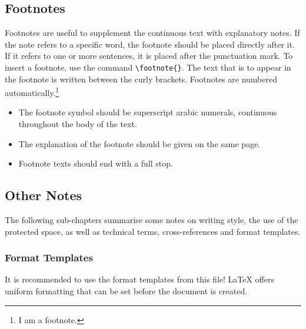 \subsection{Footnotes}

Footnotes are useful to supplement the continuous text with explanatory notes. If the note refers to a specific word, the footnote should be placed directly after it. If it refers to one or more sentences, it is placed after the punctuation mark. To insert a footnote, use the command \verb!\footnote{}!. The text that is to appear in the footnote is written between the curly brackets. Footnotes are numbered automatically.\footnote{I am a footnote.}

\begin{itemize}
    \item The footnote symbol should be superscript arabic numerals, continuous throughout the body of the text.
    \item The explanation of the footnote should be given on the same page.
    \item Footnote texts should end with a full stop. 
\end{itemize}

\subsection{Other Notes}
The following sub-chapters summarise some notes on writing style, the use of the protected space, as well as technical terms, cross-references and format templates. 

\subsubsection{Format Templates}
It is recommended to use the format templates from this file! \LaTeX { offers} uniform formatting that can be set before the document is created. 

